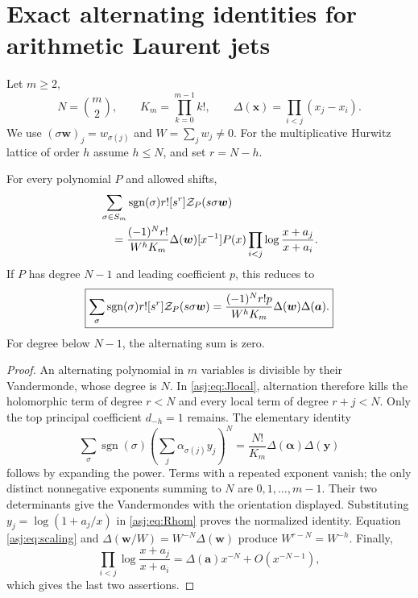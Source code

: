 \section{Exact alternating identities for arithmetic Laurent jets}
\label{asj:sec:alternants}

Let $m\ge2$,
\[
 N=\binom m2,\qquad K_m=\prod_{k=0}^{m-1}k!,\qquad
 \Delta(\boldsymbol x)=\prod_{i<j}(x_j-x_i).
\]
We use $(\sigma\boldsymbol w)_j=w_{\sigma(j)}$ and
$W=\sum_jw_j\ne0$. For the multiplicative Hurwitz lattice of order $h$
assume $h\le N$, and set $r=N-h$.

\begin{theorem}\label{asj:thm:alternant}
For every polynomial $P$ and allowed shifts,
\begin{align}\label{asj:eq:alternant}
 &\sum_{\sigma\in S_m}\operatorname{sgn}(\sigma)
           r![s^r]\mathcal Z_P(s\sigma\boldsymbol w)\notag\\
 &\quad=\frac{(-1)^N r!}{W^h K_m}\Delta(\boldsymbol w)
          [x^{-1}]P(x)\prod_{i<j}\log\frac{x+a_j}{x+a_i}.
\end{align}
If $P$ has degree $N-1$ and leading coefficient $p$, this reduces to
\begin{equation}\label{asj:eq:alternant-leading}
 \boxed{\displaystyle
 \sum_{\sigma}\operatorname{sgn}(\sigma)
           r![s^r]\mathcal Z_P(s\sigma\boldsymbol w)
  =\frac{(-1)^N r!p}{W^hK_m}
                \Delta(\boldsymbol w)\Delta(\boldsymbol a).}
\end{equation}
For degree below $N-1$, the alternating sum is zero.
\end{theorem}
\begin{proof}
An alternating polynomial in $m$ variables is divisible by their
Vandermonde, whose degree is $N$. In \eqref{asj:eq:Jlocal}, alternation
therefore kills the holomorphic term of degree $r<N$ and every local
term of degree $r+j<N$. Only the top principal coefficient $d_{-h}=1$
remains. The elementary identity
\begin{equation}\label{asj:eq:elementary-alternant}
 \sum_{\sigma}\operatorname{sgn}(\sigma)
       \left(\sum_j\alpha_{\sigma(j)}y_j\right)^N
       =\frac{N!}{K_m}\Delta(\boldsymbol\alpha)\Delta(\boldsymbol y)
\end{equation}
follows by expanding the power. Terms with a repeated exponent vanish;
the only distinct nonnegative exponents summing to $N$ are
$0,1,\ldots,m-1$. Their two determinants give the Vandermondes with the
orientation displayed. Substituting $y_j=\log(1+a_j/x)$ in
\eqref{asj:eq:Rhom} proves the normalized identity. Equation
\eqref{asj:eq:scaling} and $\Delta(\boldsymbol w/W)=W^{-N}\Delta(\boldsymbol w)$
produce $W^{r-N}=W^{-h}$. Finally,
\[
 \prod_{i<j}\log\frac{x+a_j}{x+a_i}
         =\Delta(\boldsymbol a)x^{-N}+O(x^{-N-1}),
\]
which gives the last two assertions.
\end{proof}

